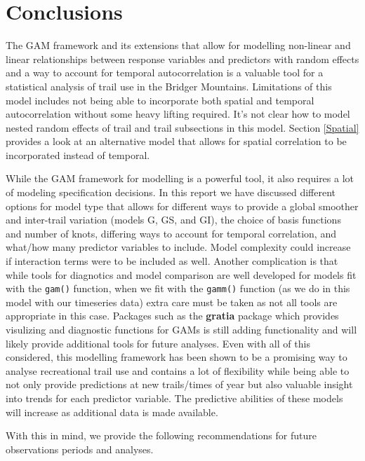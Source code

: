 \documentclass[
]{book}
\begin{document}
\hypertarget{conclusions}{%
\section{Conclusions}\label{conclusions}}

The GAM framework and its extensions that allow for modelling non-linear and linear relationships between response variables and predictors with random effects and a way to account for temporal autocorrelation is a valuable tool for a statistical analysis of trail use in the Bridger Mountains. Limitations of this model includes not being able to incorporate both spatial and temporal autocorrelation without some heavy lifting required. It's not clear how to model nested random effects of trail and trail subsections in this model. Section \ref{Spatial} provides a look at an alternative model that allows for spatial correlation to be incorporated instead of temporal.

While the GAM framework for modelling is a powerful tool, it also requires a lot of modeling specification decisions. In this report we have discussed different options for model type that allows for different ways to provide a global smoother and inter-trail variation (models G, GS, and GI), the choice of basis functions and number of knots, differing ways to account for temporal correlation, and what/how many predictor variables to include. Model complexity could increase if interaction terms were to be included as well. Another complication is that while tools for diagnotics and model comparison are well developed for models fit with the \texttt{gam()} function, when we fit with the \texttt{gamm()} function (as we do in this model with our timeseries data) extra care must be taken as not all tools are appropriate in this case. Packages such as the \textbf{gratia} package which provides visulizing and diagnostic functions for GAMs is still adding functionality and will likely provide additional tools for future analyses. Even with all of this considered, this modelling framework has been shown to be a promising way to analyse recreational trail use and contains a lot of flexibility while being able to not only provide predictions at new trails/times of year but also valuable insight into trends for each predictor variable. The predictive abilities of these models will increase as additional data is made available.

With this in mind, we provide the following recommendations for future observations periods and analyses.
\end{document}

